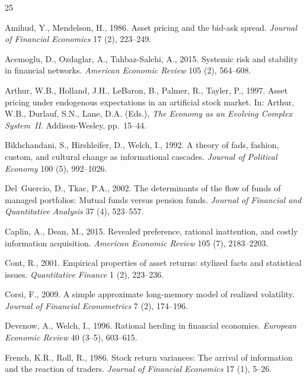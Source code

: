 \documentclass[preprint,12pt,authoryear]{elsarticle}
\begin{document}


\begin{thebibliography}{25}

Amihud, Y., Mendelson, H., 1986.
Asset pricing and the bid-ask spread.
\textit{Journal of Financial Economics} 17 (2), 223--249.

Acemoglu, D., Ozdaglar, A., Tahbaz-Salehi, A., 2015.
Systemic risk and stability in financial networks.
\textit{American Economic Review} 105 (2), 564--608.

Arthur, W.B., Holland, J.H., LeBaron, B., Palmer, R., Tayler, P., 1997.
Asset pricing under endogenous expectations in an artificial stock market.
In: Arthur, W.B., Durlauf, S.N., Lane, D.A. (Eds.),
\textit{The Economy as an Evolving Complex System~II}.
Addison-Wesley, pp.\ 15--44.

Bikhchandani, S., Hirshleifer, D., Welch, I., 1992.
A theory of fads, fashion, custom, and cultural change as informational
cascades.
\textit{Journal of Political Economy} 100 (5), 992--1026.

Del~Guercio, D., Tkac, P.A., 2002.
The determinants of the flow of funds of managed portfolios:
Mutual funds versus pension funds.
\textit{Journal of Financial and Quantitative Analysis} 37 (4), 523--557.

Caplin, A., Dean, M., 2015.
Revealed preference, rational inattention, and costly information acquisition.
\textit{American Economic Review} 105 (7), 2183--2203.

Cont, R., 2001.
Empirical properties of asset returns: stylized facts and statistical issues.
\textit{Quantitative Finance} 1 (2), 223--236.

Corsi, F., 2009.
A simple approximate long-memory model of realized volatility.
\textit{Journal of Financial Econometrics} 7 (2), 174--196.

Devenow, A., Welch, I., 1996.
Rational herding in financial economics.
\textit{European Economic Review} 40 (3--5), 603--615.

French, K.R., Roll, R., 1986.
Stock return variances: The arrival of information and the reaction
of traders.
\textit{Journal of Financial Economics} 17 (1), 5--26.


\end{thebibliography}
\end{document}
